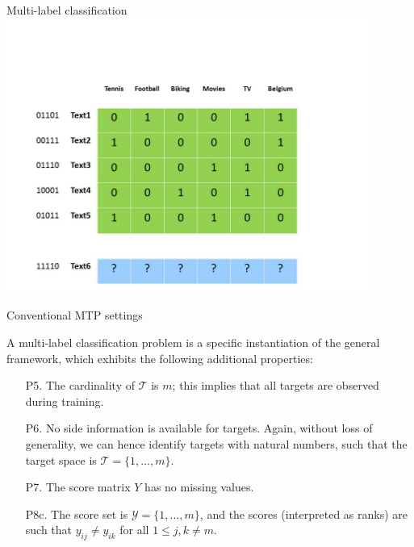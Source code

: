 \documentclass[]{beamer}
\begin{document}
\begin{frame}{Multi-label classification}
\includegraphics[width=0.9\textwidth,trim = 0 0 100 100,clip]{Figures/pictures/Slide2}
\end{frame}


\begin{frame}{Conventional MTP settings}
\begin{definition} 
A multi-label classification problem is a specific instantiation of the general framework, which exhibits the following additional properties: 
\begin{enumerate}
\item[P5.] The cardinality of $\mathcal{T}$ is $m$; this implies that all targets are observed during training. 
\item[P6.] No side information is available for targets. Again, without loss of generality, we can hence identify targets with natural numbers, such that the target space is $\mathcal{T} = \{1,...,m\}$. 
\item[P7.] The score matrix $Y$ has no missing values. 
\item[P8c.] The score set is $\mathcal{Y} = \{1, \ldots , m\}$, and the scores (interpreted as ranks) are such that $y_{ij} \neq y_{ik}$ for all $1 \leq j,k \neq m$. 
\end{enumerate}
\end{definition}
\end{frame}
\end{document}
